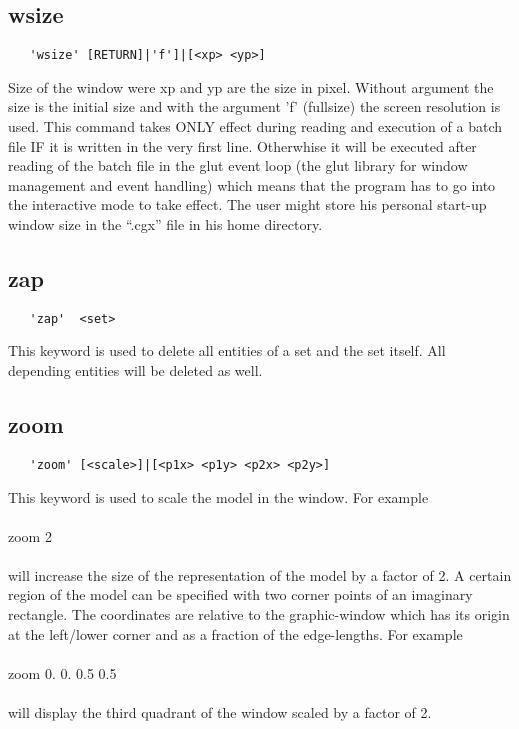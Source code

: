 \documentclass{article}
\begin{document}
\subsection{\label{wsize}wsize}
\begin{verbatim}
   'wsize' [RETURN]|'f']|[<xp> <yp>]
\end{verbatim}
Size of the window were xp and yp are the size in pixel. Without argument the size is the initial size and with the argument 'f' (fullsize) the screen resolution is used. This command takes ONLY effect during reading and execution of a batch file IF it is written in the very first line. Otherwhise it will be executed after reading of the batch file in the glut event loop (the glut library \cite{glut} for window management and event handling) which means that the program has to go into the interactive mode to take effect. The user might store his personal start-up window size in the ``.cgx'' file in his home directory.

\subsection{\label{zap}zap}
\begin{verbatim}
   'zap'  <set> 
\end{verbatim}
This keyword is used to delete all entities of a set and the set itself. All depending entities will be deleted as well.

\subsection{\label{zoom}zoom}
\begin{verbatim}
   'zoom' [<scale>]|[<p1x> <p1y> <p2x> <p2y>]
\end{verbatim}
This keyword is used to scale the model in the window. For example\\\\zoom 2\\\\will increase the size of the representation of the model by a factor of 2. A certain region of the model can be specified with two corner points of an imaginary rectangle. The coordinates are relative to the graphic-window which has its origin at the left/lower corner and as a fraction of the edge-lengths. For example \\\\zoom 0. 0. 0.5 0.5\\\\will display the third quadrant of the window scaled by a factor of 2.  
\end{document}
